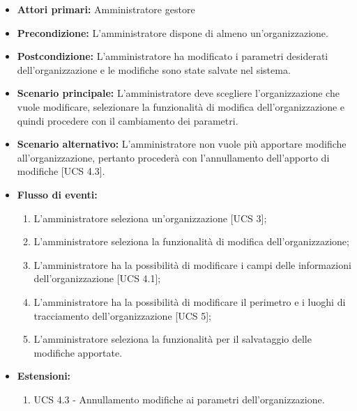 \begin{itemize}
    \item \textbf{Attori primari:} Amministratore gestore
    \item \textbf{Precondizione:} L’amministratore dispone di almeno un'organizzazione.
    \item \textbf{Postcondizione:} L’amministratore ha modificato i parametri desiderati dell'organizzazione e le modifiche sono state salvate nel sistema.
    \item \textbf{Scenario principale:} L'amministratore deve scegliere l'organizzazione che vuole modificare, selezionare la funzionalità di modifica dell'organizzazione e quindi procedere con il cambiamento dei parametri.
    \item \textbf{Scenario alternativo:} L'amministratore non vuole più apportare modifiche all'organizzazione, pertanto procederà con l'annullamento dell'apporto di modifiche [UCS 4.3].
    \item \textbf{Flusso di eventi:}
    \begin{enumerate}
        \item L'amministratore seleziona un'organizzazione [UCS 3];
        \item L'amministratore seleziona la funzionalità di modifica dell'organizzazione;
        \item L'amministratore ha la possibilità di modificare i campi delle informazioni dell’organizzazione [UCS 4.1];
        \item L'amministratore ha la possibilità di modificare il perimetro e i luoghi di tracciamento dell’organizzazione [UCS 5];
        \item L'amministratore seleziona la funzionalità per il salvataggio delle modifiche apportate.
    \end{enumerate}
    \item \textbf{Estensioni:}
    \begin{enumerate}
        \item UCS 4.3 - Annullamento modifiche ai parametri dell'organizzazione.
    \end{enumerate}
\end{itemize}

